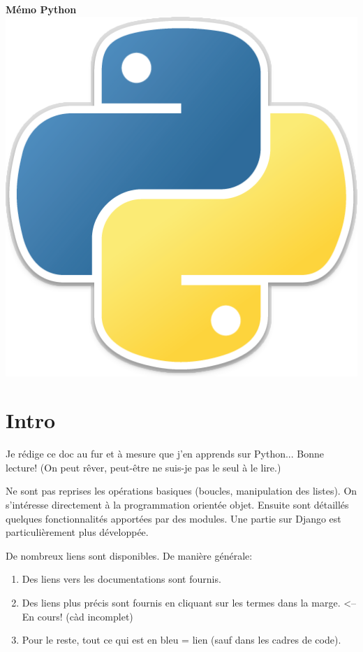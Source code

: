 \documentclass[a4paper, 10pt]{article}
\begin{document}

\begin{center}
        {\Huge{\sc\bfseries{Mémo Python}}}\\[20pt]
        \includegraphics[scale=0.1]{python.png}
        \vspace{20pt}
\end{center}

\tableofcontents

\hypersetup{linkcolor=blue}

\newpage
\section*{Intro}

Je rédige ce doc au fur et à mesure que j'en apprends sur Python... Bonne lecture! (On peut rêver, peut-être ne suis-je pas le seul à le lire.)\bigskip

Ne sont pas reprises les opérations \og basiques \fg{} (boucles, manipulation des listes). On s'intéresse directement à la programmation orientée objet. Ensuite sont détaillés quelques fonctionnalités apportées par des modules. Une partie sur Django est particulièrement plus développée.\bigskip

De nombreux liens sont disponibles. De manière générale:
\begin{enumerate}
    \item Des liens vers les documentations sont fournis.
    \item Des liens plus précis sont fournis en cliquant sur les termes dans la marge. <-- En cours! (càd incomplet)
    \item Pour le reste, tout ce qui est en bleu = lien (sauf dans les cadres de code).
\end{enumerate}
\end{document}
